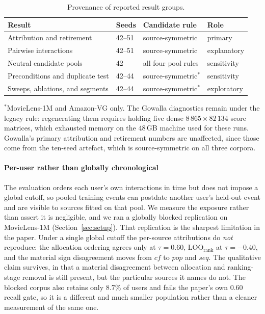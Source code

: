 \documentclass[pdflatex,sn-basic,Numbered]{sn-jnl}
\theoremstyle{plain}
\theoremstyle{definition}
\newcommand{\LOOr}{\mathrm{LOO}_{\mathrm{rank}}}
\begin{document}
\begin{table}[tbp]
\caption{Provenance of reported result groups.}
\label{tab:provenance}
\centering
\small
\begin{tabular}{@{}llll@{}}
\toprule
Result & Seeds & Candidate rule & Role \\
\midrule
Attribution and retirement & 42--51 & source-symmetric & primary \\
Pairwise interactions & 42--51 & source-symmetric & explanatory \\
Neutral candidate pools & 42 & all four pool rules & sensitivity \\
Preconditions and duplicate test & 42--44 & source-symmetric$^{\ast}$ & sensitivity \\
Sweeps, ablations, and segments & 42--44 & source-symmetric$^{\ast}$ & exploratory \\
\bottomrule
\end{tabular}
\smallskip
\noindent\footnotesize $^{\ast}$MovieLens-1M and Amazon-VG only. The Gowalla
diagnostics remain under the legacy rule: regenerating them requires holding
five dense $8\,865 \times 82\,134$ score matrices, which exhausted memory on
the $48$\,GB machine used for these runs. Gowalla's primary attribution and
retirement numbers are unaffected, since those come from the ten-seed
artefact, which is source-symmetric on all three corpora.
\end{table}

\paragraph{Per-user rather than globally chronological}
The evaluation orders each user's own interactions in time but does not impose
a global cutoff, so pooled training events can postdate another user's
held-out event and are visible to sources fitted on that pool. We measure the
exposure rather than assert it is negligible, and we ran a globally blocked
replication on MovieLens-1M (Section~\ref{sec:setup}). That replication is the
sharpest limitation in the paper. Under a single global cutoff the
per-source attributions do \emph{not} reproduce: the allocation ordering
agrees only at $\tau = 0.60$, $\LOOr$ at $\tau = -0.40$, and the material sign
disagreement moves from $cf$ to $pop$ and $seq$. The qualitative claim
survives, in that a material disagreement between allocation and ranking-stage
removal is still present, but the particular sources it names do not. The
blocked corpus also retains only $8.7\%$ of users and fails the paper's own
$0.60$ recall gate, so it is a different and much smaller population rather
than a cleaner measurement of the same one.
\end{document}
